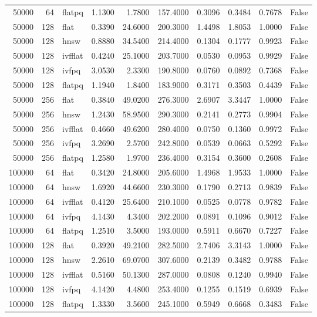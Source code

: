 \begin{tabular}{rrlrrrrrrr}
50000 & 64 & flatpq & 1.1300 & 1.7800 & 157.4000 & 0.3096 & 0.3484 & 0.7678 & False \\
50000 & 128 & flat & 0.3390 & 24.6000 & 200.3000 & 1.4498 & 1.8053 & 1.0000 & False \\
50000 & 128 & hnsw & 0.8880 & 34.5400 & 214.4000 & 0.1304 & 0.1777 & 0.9923 & False \\
50000 & 128 & ivfflat & 0.4240 & 25.1000 & 203.7000 & 0.0530 & 0.0953 & 0.9929 & False \\
50000 & 128 & ivfpq & 3.0530 & 2.3300 & 190.8000 & 0.0760 & 0.0892 & 0.7368 & False \\
50000 & 128 & flatpq & 1.1940 & 1.8400 & 183.9000 & 0.3171 & 0.3503 & 0.4439 & False \\
50000 & 256 & flat & 0.3840 & 49.0200 & 276.3000 & 2.6907 & 3.3447 & 1.0000 & False \\
50000 & 256 & hnsw & 1.2430 & 58.9500 & 290.3000 & 0.2141 & 0.2773 & 0.9904 & False \\
50000 & 256 & ivfflat & 0.4660 & 49.6200 & 280.4000 & 0.0750 & 0.1360 & 0.9972 & False \\
50000 & 256 & ivfpq & 3.2690 & 2.5700 & 242.8000 & 0.0539 & 0.0663 & 0.5292 & False \\
50000 & 256 & flatpq & 1.2580 & 1.9700 & 236.4000 & 0.3154 & 0.3600 & 0.2608 & False \\
100000 & 64 & flat & 0.3420 & 24.8000 & 205.6000 & 1.4968 & 1.9533 & 1.0000 & False \\
100000 & 64 & hnsw & 1.6920 & 44.6600 & 230.3000 & 0.1790 & 0.2713 & 0.9839 & False \\
100000 & 64 & ivfflat & 0.4120 & 25.6400 & 210.1000 & 0.0525 & 0.0778 & 0.9782 & False \\
100000 & 64 & ivfpq & 4.1430 & 4.3400 & 202.2000 & 0.0891 & 0.1096 & 0.9012 & False \\
100000 & 64 & flatpq & 1.2510 & 3.5000 & 193.0000 & 0.5911 & 0.6670 & 0.7227 & False \\
100000 & 128 & flat & 0.3920 & 49.2100 & 282.5000 & 2.7406 & 3.3143 & 1.0000 & False \\
100000 & 128 & hnsw & 2.2610 & 69.0700 & 307.6000 & 0.2139 & 0.3482 & 0.9788 & False \\
100000 & 128 & ivfflat & 0.5160 & 50.1300 & 287.0000 & 0.0808 & 0.1240 & 0.9940 & False \\
100000 & 128 & ivfpq & 4.1420 & 4.4800 & 253.4000 & 0.1255 & 0.1519 & 0.6939 & False \\
100000 & 128 & flatpq & 1.3330 & 3.5600 & 245.1000 & 0.5949 & 0.6668 & 0.3483 & False \\

\end{tabular}
